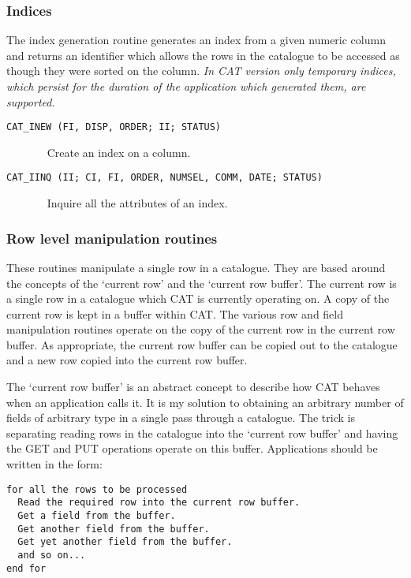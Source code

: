 \subsubsection{Indices}

The index generation routine generates an index from a given numeric
column and returns an identifier which allows the rows in the catalogue
to be accessed as though they were sorted on the column.   {\it In CAT
version \CATversion only temporary indices, which persist for the
duration of the application which generated them, are supported.}

\begin{description}

  \item[ {\tt CAT\_INEW (FI, DISP, ORDER; II; STATUS) } ] ~
  \newline Create an index on a column.

  \item[ {\tt CAT\_IINQ (II; CI, FI, ORDER, NUMSEL, COMM, DATE; STATUS) } ] ~
  \newline Inquire all the attributes of an index.

\end{description}

\subsubsection{Row level manipulation routines}

These routines manipulate a single row in a catalogue. They are based
around the concepts of the `current row' and the `current row buffer'.
The current row is a single row in a catalogue which CAT is
currently operating on. A copy of the current row is kept in a buffer
within CAT. The various row and field manipulation routines operate
on the copy of the current row in the current row buffer. As
appropriate, the current row buffer can be copied out to the catalogue
and a new row copied into the current row buffer.

The `current row buffer' is an abstract concept to describe how CAT
behaves when an application calls it. It is my solution to obtaining
an arbitrary number of fields of arbitrary type in a single
pass through a catalogue. The trick is separating reading rows in the
catalogue into the `current row buffer' and having the GET and PUT
operations operate on this buffer. Applications should be written in the
form:

\begin{verbatim}
for all the rows to be processed
  Read the required row into the current row buffer.
  Get a field from the buffer.
  Get another field from the buffer.
  Get yet another field from the buffer.
  and so on...
end for
\end{verbatim}

